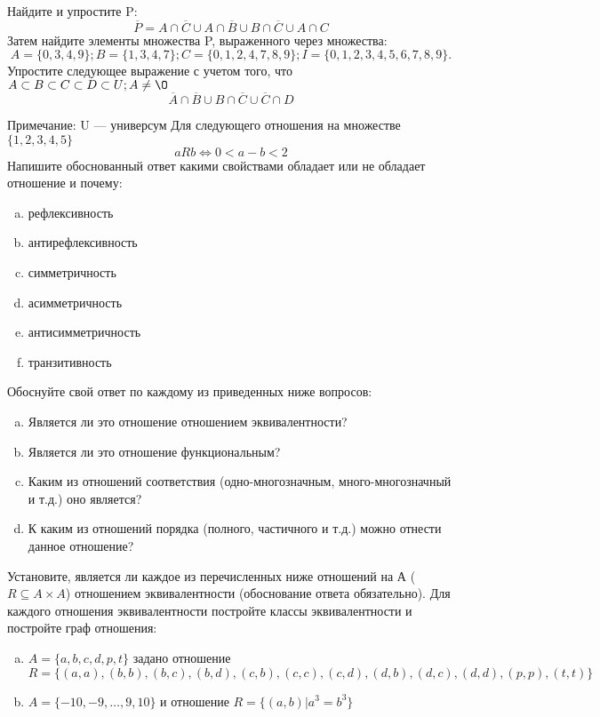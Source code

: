 \documentclass[10pt]{exam}
\begin{document}
\begin{questions}
\question
Найдите и упростите P:
\begin{equation*}
\overline{P} = A \cap \overline{C} \cup A \cap \overline{B} \cup B \cap \overline{C} \cup A \cap C
\end{equation*}
Затем найдите элементы множества P, выраженного через множества:
\begin{equation*}
A = \{0, 3, 4, 9\}; 
B = \{1, 3, 4, 7\};
C = \{0, 1, 2, 4, 7, 8, 9\};
I = \{0, 1, 2, 3, 4, 5, 6, 7, 8, 9\}.
\end{equation*}\question
Упростите следующее выражение с учетом того, что $A\subset B \subset C \subset D \subset U; A \neq \O$
\begin{equation*}
\overline{A} \cap \overline{B} \cup B \cap \overline{C} \cup \overline{C} \cap D
\end{equation*}

Примечание: U — универсум\question
Для следующего отношения на множестве $\{1, 2, 3, 4, 5\}$ 
\begin{equation*}
aRb \iff 0 < a-b<2
\end{equation*}
Напишите обоснованный ответ какими свойствами обладает или не обладает отношение и почему:   
\begin{enumerate} [a)]\setcounter{enumi}{0}
\item рефлексивность
\item антирефлексивность
\item симметричность
\item асимметричность
\item антисимметричность
\item транзитивность
\end{enumerate}

Обоснуйте свой ответ по каждому из приведенных ниже вопросов:
\begin{enumerate} [a)]\setcounter{enumi}{0}
    \item Является ли это отношение отношением эквивалентности?
    \item Является ли это отношение функциональным?
    \item Каким из отношений соответствия (одно-многозначным, много-многозначный и т.д.) оно является?
    \item К каким из отношений порядка (полного, частичного и т.д.) можно отнести данное отношение?
\end{enumerate}
\question
Установите, является ли каждое из перечисленных ниже отношений на А ($R \subseteq A \times A$) отношением эквивалентности (обоснование ответа обязательно). Для каждого отношения эквивалентности постройте классы 
эквивалентности и постройте граф отношения:
\begin{enumerate} [a)]\setcounter{enumi}{0}
\item $A = \{a, b, c, d, p, t\}$ задано отношение $R = \{(a, a), (b, b), (b, c), (b, d), (c, b), (c, c), (c, d), (d, b), (d, c), (d, d), (p,p), (t,t)\}$
\item $A = \{-10, -9, … , 9, 10\}$ и отношение $R = \{(a,b)|a^{3} = b^{3}\}$


\end{enumerate}
\end{questions}
\end{document}
